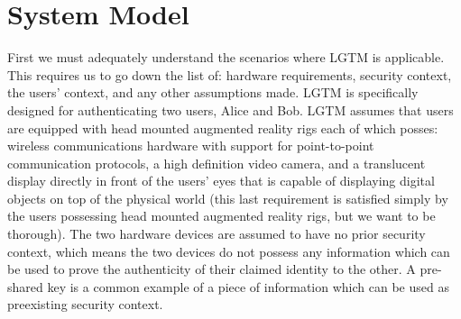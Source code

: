 \documentclass[12pt,dvips]{report}
\begin{document}
\section{System Model}
First we must adequately understand the scenarios where LGTM is applicable. This requires us to go down the list of: hardware requirements, security context, the users' context, and any other assumptions made. 
LGTM is specifically designed for authenticating two users, Alice and Bob.
LGTM assumes that users are equipped with head mounted augmented reality rigs each of which posses: wireless communications hardware with support for point-to-point communication protocols, a high definition video camera, and a translucent display directly in front of the users' eyes that is capable of displaying digital objects on top of the physical world (this last requirement is satisfied simply by the users possessing head mounted augmented reality rigs, but we want to be thorough). 
The two hardware devices are assumed to have no prior security context, which means the two devices do not possess any information which can be used to prove the authenticity of their claimed identity to the other. A pre-shared key is a common example of a piece of information which can be used as preexisting security context.
\end{document}

